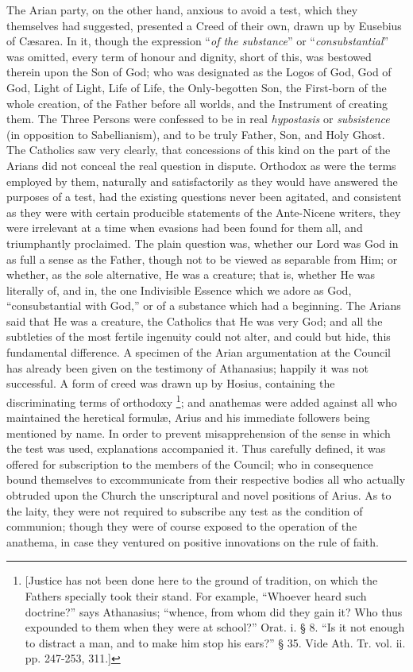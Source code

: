 The Arian party, on the other hand, anxious to avoid a test, which
they themselves had suggested, presented a Creed of their own, drawn
up by Eusebius of Cæsarea. In it, though the expression ``\emph{of
the substance}'' or ``\emph{consubstantial}'' was
omitted, every term of honour and dignity, short of this, was bestowed
therein upon the Son of God; who was designated as the Logos of God,
God of God, Light of Light, Life of Life, the Only-begotten Son, the
First-born of the whole creation, of the Father before all worlds, and
the Instrument of creating them. The Three Persons were confessed to
be in real \emph{hypostasis} or \emph{subsistence} (in opposition to
Sabellianism), and to be truly Father, Son, and Holy Ghost. The
Catholics saw very clearly, that concessions of this kind on the part
of the Arians did not conceal the real question in dispute. Orthodox
as were the terms employed by them, naturally and satisfactorily as
they would have answered the purposes of a test, had the existing
questions never been agitated, and consistent as they were with
certain producible statements of the Ante-Nicene writers, they were
irrelevant at a time when evasions had been found for them all, and
triumphantly proclaimed. The plain question was, whether our Lord was
God in as full a sense as the Father, though not to be viewed as
separable from Him; or whether, as the sole alternative, He was
a creature; that is, whether He was literally of, and in, the one
Indivisible Essence which we adore as God, ``consubstantial with
God,'' or of a substance which had a beginning. The Arians said
that He was a creature, the Catholics that He was very God; and all
the subtleties of the most fertile ingenuity could not alter, and
could but hide, this fundamental difference. A specimen of the Arian
argumentation at the Council has already been given on the testimony
of Athanasius; happily it was not successful. A form of creed was
drawn up by Hosius, containing the discriminating terms of orthodoxy \footnote{[Justice has not been done here to the
ground of tradition, on which the Fathers specially took their stand.
For example, ``Whoever heard such doctrine?'' says Athanasius;
``whence, from whom did they gain it? Who thus expounded to them
when they were at school?'' Orat. i. § 8. ``Is it not enough
to distract a man, and to make him stop his ears?'' § 35. Vide
Ath. Tr. vol. ii. pp. 247-253, 311.]}; and anathemas were added against all who maintained the
heretical formulæ, Arius and his immediate followers being mentioned
by name. In order to prevent misapprehension of the sense in which the
test was used, explanations accompanied it. Thus carefully defined, it
was offered for subscription to the members of the Council; who in
consequence bound themselves to excommunicate from their respective
bodies all who actually obtruded upon the Church the unscriptural and
novel positions of Arius. As to the laity, they were not required to
subscribe any test as the condition of communion; though they were of
course exposed to the operation of the anathema, in case they ventured
on positive innovations on the rule of faith.

